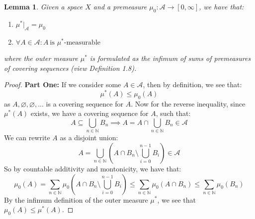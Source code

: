 \documentclass[10pt,letterpaper]{article} %
\newtheorem{lem}{Lemma}[section]
\begin{document}
\begin{lem}\label{Lemma 1.10}
Given a space $X$ and a premeasure $\mu_0: \mathcal{A} \xrightarrow{} [0, \infty]$, we have that:
\begin{enumerate}
\item $\mu^*|_\mathcal{A} = \mu_0$
\item $\forall A \in \mathcal{A}: A \ \text{is } \mu^*\text{-measurable}$
\end{enumerate}
where the outer measure $\mu^*$ is formulated as the infimum of sums of premeasures of covering sequences (view Definition 1.8).
\end{lem}
\begin{proof}
\textbf{Part One:} If we consider some $A \in \mathcal{A}$, then by definition, we see that:
\begin{equation*}
\mu^*(A) \leqslant \mu_0(A)
\end{equation*}
as $A, \varnothing, \varnothing,...$ is a covering sequence for $A$. Now for the reverse inequality, since $\mu^*(A)$ exists, we have a covering sequence for $A$, such that:
\begin{equation*}
A \subseteq \bigcup_{n \in \mathbb{N}}B_n \implies A = A \cap \bigcup_{n \in \mathbb{N}}B_n \in \mathcal{A}
\end{equation*}
We can rewrite $A$ as a disjoint union:
\begin{equation*}
A = \bigcup_{n \in \mathbb{N}}\left(A \cap B_n \setminus \bigcup_{i=0}^{n-1}B_i\right) \in \mathcal{A}
\end{equation*}
So by countable additivity and montonicity, we have that:
\begin{equation*}
\mu_0(A) = \sum_{n \in \mathbb{N}}\mu_0\left(A \cap B_n \setminus \bigcup_{i=0}^{n-1}B_i\right) \leqslant \sum_{n \in \mathbb{N}}\mu_0(A \cap B_n) \leqslant \sum_{n \in \mathbb{N}}\mu_0(B_n)
\end{equation*}
By the infimum definition of the outer measure $\mu^*$, we see that $\mu_0(A) \leqslant \mu^*(A)$. 


\end{proof}
\end{document}
